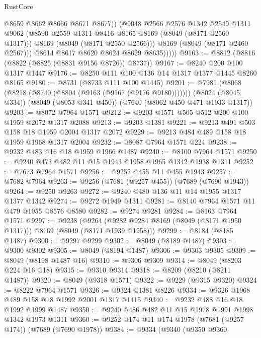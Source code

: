 \begin{lexlean}{RustCore}
\begin{coremodule}
                    @8659
                    @8662
                    @8666
                    @8671
                    @8677))
                (@9048
                  @2566
                  @2576
                  @1342
                  @2549
                  @1311
                  @9062
                  (@8590 @2559 @1311 @8416 @8165 @8169 (@8049 (@8171 @2560 @1317)))
                  @8169
                  (@8049 (@8171 @2550 @2566)))
                @8169
                (@8049 (@8171 @2460 @2567)))
              @8614
              @8617
              @8620
              @8624
              @8629
              @8635)))))
@9163 := @8812 (@8816 (@8822 (@8825 (@8831 @9156 @8726)) @8737))
@9167 := @8240 @200 @100 @1317 @1447
@9176 := @8250 @111 @100 @136 @14 @1317 @1377 @1445 @8260 @8165
@9180 := @8731 (@8733 @111 @100 @1445)
@9201 := @7981
    (@8068 (@8218 (@8740 (@8804 (@9163 (@9167 (@9176 @9180)))))))
    (@8024 (@8045 @334))
    (@8049 (@8053 @341 @450))
    (@7640 (@8062 @450 @471 @1933 @1317))
@9203 := @8072 @7964 @1571
@9212 := @9203 @1571 @505 @512 @200 @100 @1959 @2072 @1317 @2088
@9213 := @9203 @1381
@9221 := @9213 @491 @503 @158 @18 @1959 @2004 @1317 @2072
@9229 := @9213 @484 @489 @158 @18 @1959 @1968 @1317 @2004
@9232 := @8087 @7964 @1571 @224
@9238 := @9232 @483 @16 @18 @1959 @1966 @1487
@9240 := @8100 @7964 @1571
@9250 := @9240 @473 @482 @11 @15 @1943 @1958 @1965 @1342 @1938 @1311
@9252 := @7673 @7964 @1571
@9256 := @9252 @455 @11 @455 @1943
@9257 := @7682 @7964
@9263 := @9256 (@7681 (@9257 @455)) (@7689 (@7690 @1943))
@9264 := @9250 @9263
@9272 := @9240 @480 @136 @11 @14 @1955 @1317 @1377 @1342
@9274 := @9272 @1949 @1311
@9281 := @8140 @7964 @1571 @11 @479 @1955 @8576 @8580
@9282 := @9274 @9281
@9284 := @8163 @7964 @1571
@9297 := @9238
    (@9264 (@9282 @9284 @8169 (@8049 (@8171 @1950 @1317))) @8169 (@8049 (@8171 @1939 @1958)))
@9299 := @8184 (@8185 @1487)
@9300 := @9297 @9299
@9302 := @8049 (@8189 @1487)
@9303 := @9300 @9302
@9305 := @8049 (@8194 @1487)
@9306 := @9303 @9305
@9309 := @8049 (@8198 @1487 @16)
@9310 := @9306 @9309
@9314 := @8049 (@8203 @224 @16 @18)
@9315 := @9310 @9314
@9318 := @8209 (@8210 (@8211 @1487))
@9320 := @8049 (@9318 @1571)
@9322 := @9229 (@9315 @9320)
@9324 := @8222 @7964 @1571
@9326 := @9324 @1381 @8226
@9334 := @9326 @1968 @489 @158 @18 @1992 @2001 @1317 @1415
@9340 := @9232 @488 @16 @18 @1992 @1999 @1487
@9350 := @9240 @486 @482 @11 @15 @1978 @1991 @1998 @1342 @1973 @1311
@9360 := @9252 @174 @11 @174 @1978 (@7681 (@9257 @174)) (@7689 (@7690 @1978))
@9384 := @9334
    (@9340
      (@9350
        @9360

\end{coremodule}
\end{lexlean}
